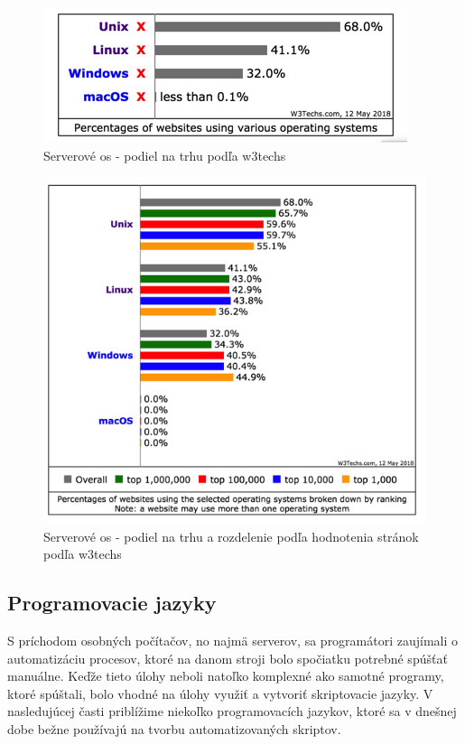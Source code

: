 \begin{figure}[H]
	\centering
	\includegraphics[scale=0.4]{img/usg_server.png}
	\caption{Serverové \acrshort{os} - podiel na trhu podľa w3techs\cite{pop}}
	\label{fig:test}
	
\end{figure}
\begin{figure}[H]
	\centering
	\includegraphics[scale=0.4]{img/usage_grou_by_os_sites.png}
	\caption{Serverové \acrshort{os} - podiel na trhu a rozdelenie podľa hodnotenia stránok podľa w3techs\cite{pop}}
	\label{fig:test}
	
\end{figure}

\subsection{Programovacie jazyky}
\indent S príchodom osobných počítačov, no najmä serverov, sa programátori zaujímali o automatizáciu procesov, ktoré na danom stroji bolo spočiatku potrebné spúšťať manuálne. Keďže tieto úlohy neboli natoľko komplexné ako samotné programy, ktoré spúštali, bolo vhodné na úlohy využiť a vytvoriť skriptovacie jazyky. V nasledujúcej časti priblížime niekoľko programovacích jazykov, ktoré sa v dnešnej dobe bežne používajú na tvorbu automatizovaných skriptov.

